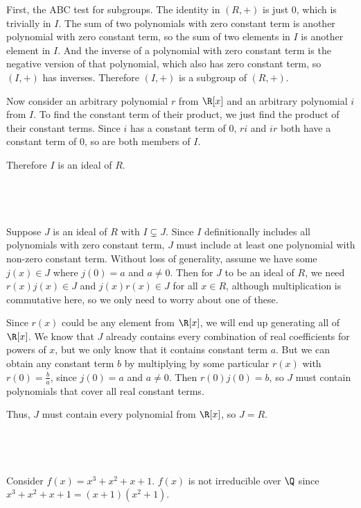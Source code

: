 \documentclass[a4paper]{article}
\begin{document}
First, the ABC test for subgroups. The identity in $(R, +)$ is just $0$, which is trivially in $I$. The sum of two polynomials with zero constant term is another polynomial with zero constant term, so the sum of two elements in $I$ is another element in $I$. And the inverse of a polynomial with zero constant term is the negative version of that polynomial, which also has zero constant term, so $(I, +)$ has inverses. Therefore $(I, +)$ is a subgroup of $(R, +)$.

Now consider an arbitrary polynomial $r$ from $\R[x]$ and an arbitrary polynomial $i$ from $I$. To find the constant term of their product, we just find the product of their constant terms. Since $i$ has a constant term of $0$, $ri$ and $ir$ both have a constant term of $0$, so are both members of $I$.

Therefore $I$ is an ideal of $R$.

\subsection{~}

Suppose $J$ is an ideal of $R$ with $I \subsetneq J$. Since $I$ definitionally includes all polynomials with zero constant term, $J$ must include at least one polynomial with non-zero constant term. Without loss of generality, assume we have some $j(x) \in J$ where $j(0) = a$ and $a \ne 0$. Then for $J$ to be an ideal of $R$, we need $r(x) j(x) \in J$ and $j(x) r(x) \in J$ for all $x \in R$, although multiplication is commutative here, so we only need to worry about one of these.

Since $r(x)$ could be any element from $\R[x]$, we will end up generating all of $\R[x]$. We know that $J$ already contains every combination of real coefficients for powers of $x$, but we only know that it contains constant term $a$. But we can obtain any constant term $b$ by multiplying by some particular $r(x)$ with $r(0) = \frac ba$, since $j(0) = a$ and $a \ne 0$. Then $r(0) j(0) = b$, so $J$ must contain polynomials that cover all real constant terms.

Thus, $J$ must contain every polynomial from $\R[x]$, so $J = R$.


\subsection{~}

Consider $f(x) = x^3 + x^2 + x + 1$. $f(x)$ is not irreducible over $\Q$ since $x^3 + x^2 + x + 1 = (x + 1) (x^2 + 1)$.
\end{document}
